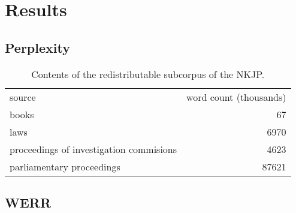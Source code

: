 \chapter{Results}
\label{chapter:results}
\section{Perplexity}

\begin{table}[h!]
  \begin{center}
	  \caption{Contents of the redistributable subcorpus of the NKJP.}
	    \label{table:freenkjp}
	    \begin{tabular*}{.6\linewidth}{@{\extracolsep{\fill}}lr}
      source & word count (thousands) \\
      \cmidrule{1-2}
      books & 67\\
      laws & 6970\\
      proceedings of investigation commisions & 4623\\
      parliamentary proceedings & 87621\\
    \end{tabular*}
  \end{center}
\end{table}

\section{WERR}
